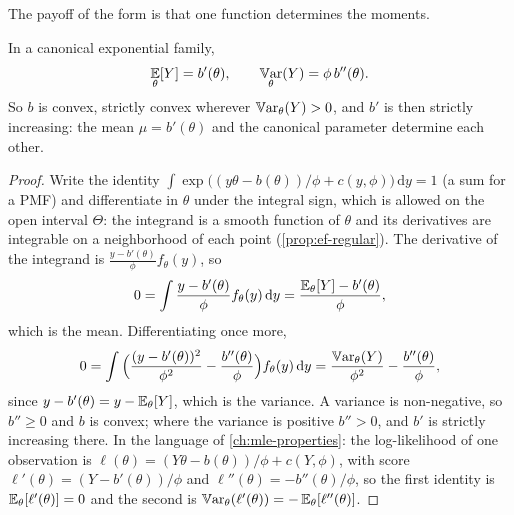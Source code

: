 The payoff of the form is that one function determines the moments.

\begin{theorem}
\label{thm:ef-moments}
In a canonical exponential family,
\[
\operatorname*{\mathbb{E}}_\theta[Y] = b'(\theta), \qquad \operatorname*{\mathbb{V}\text{ar}}_\theta(Y) = \phi\,b''(\theta).
\]
So $b$ is convex, strictly convex wherever $\operatorname*{\mathbb{V}\text{ar}}_\theta(Y) > 0$, and $b'$ is then strictly increasing: the mean $\mu = b'(\theta)$ and the canonical parameter determine each other.
\end{theorem}
\begin{proof}
Write the identity $\int \exp\big((y\theta - b(\theta))/\phi + c(y, \phi)\big)\,\mathrm{d}y = 1$ (a sum for a PMF) and differentiate in $\theta$ under the integral sign, which is allowed on the open interval $\Theta$: the integrand is a smooth function of $\theta$ and its derivatives are integrable on a neighborhood of each point (\cref{prop:ef-regular}).
The derivative of the integrand is $\frac{y - b'(\theta)}{\phi}f_\theta(y)$, so
\[
0 = \int \frac{y - b'(\theta)}{\phi}f_\theta(y)\,\mathrm{d}y = \frac{\operatorname*{\mathbb{E}}_\theta[Y] - b'(\theta)}{\phi},
\]
which is the mean.
Differentiating once more,
\[
0 = \int \Big(\frac{(y - b'(\theta))^2}{\phi^2} - \frac{b''(\theta)}{\phi}\Big)f_\theta(y)\,\mathrm{d}y = \frac{\operatorname*{\mathbb{V}\text{ar}}_\theta(Y)}{\phi^2} - \frac{b''(\theta)}{\phi},
\]
since $y - b'(\theta) = y - \operatorname*{\mathbb{E}}_\theta[Y]$, which is the variance.
A variance is non-negative, so $b'' \geq 0$ and $b$ is convex; where the variance is positive $b'' > 0$, and $b'$ is strictly increasing there.
In the language of \cref{ch:mle-properties}: the log-likelihood of one observation is $\ell(\theta) = (Y\theta - b(\theta))/\phi + c(Y, \phi)$, with score $\ell'(\theta) = (Y - b'(\theta))/\phi$ and $\ell''(\theta) = -b''(\theta)/\phi$, so the first identity is $\operatorname*{\mathbb{E}}_\theta[\ell'(\theta)] = 0$ and the second is $\operatorname*{\mathbb{V}\text{ar}}_\theta(\ell'(\theta)) = -\operatorname*{\mathbb{E}}_\theta[\ell''(\theta)]$.
\end{proof}

